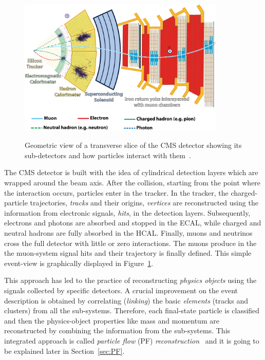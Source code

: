 \begin{figure}[h]
\centering
\includegraphics[width=0.88\textwidth]{Figures/c2/CMSslice.png}\\
\caption{Geometric view of a transverse slice of the CMS detector showing its sub-detectors and how particles interact with them~\cite{Barney:2120661}.}
\label{fig:cmsslice}
\end{figure} 
The CMS detector is built with the idea of cylindrical detection layers
which are wrapped around the beam axis. After the collision, starting
from the point where the interaction occurs, particles enter in the
tracker. In the tracker, the charged-particle trajectories, \emph{tracks}
and their origins, \emph{vertices} are reconstructed using the information from
electronic signals, \emph{hits}, in the detection layers. Subsequently,
electrons and photons are absorbed and stopped in the ECAL, while
charged and neutral hadrons are fully absorbed in the HCAL. Finally, muons and neutrinos cross
the full detector with little or zero interactions. The muons 
produce in the the muon-system signal hits and their trajectory is finally defined. This simple
event-view is graphically displayed in Figure~\ref{fig:cmsslice}.


This approach has led to the practice of reconstructing \emph{physics
objects} using the signals collected by specific
detectors.
A crucial improvement on the event description is obtained by
correlating (\emph{linking}) the basic \emph{elements} (\ie tracks and
clusters) from all the sub-systems. Therefore, each final-state
particle is classified and then the physics-object properties like
mass and momentum are reconstructed by combining the information from
the sub-systems. This
integrated approach is called \emph{particle flow} (PF)
\emph{reconstruction}~\cite{CMS:particleflow} and it is going to be
explained later in Section~\ref{sec:PF}.

